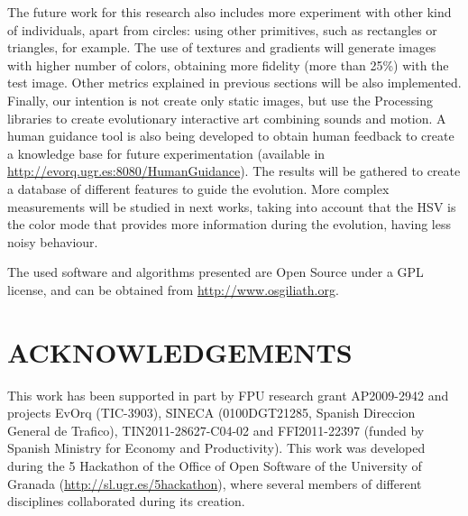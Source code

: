 \documentclass[a4paper,twoside]{article}
\begin{document}
The future work for this research also includes more experiment with other kind of individuals, apart from circles: using other primitives, such as rectangles or triangles, for example. The use of textures and gradients will generate images with higher number of colors, obtaining more fidelity (more than 25\%) with the test image. Other metrics explained in previous sections will be also implemented. Finally, our intention is not create only static images, but use the Processing libraries to create evolutionary interactive art combining sounds and motion. A human guidance tool is also being developed to obtain human feedback to create a knowledge base for future experimentation (available in \url{http://evorq.ugr.es:8080/HumanGuidance}). The results will be gathered to create a database of different features to guide the evolution. More complex measurements will be studied in next works, taking into account that the HSV is the color mode that provides more information during the evolution, having less noisy behaviour.

The used software and algorithms presented are Open Source under a GPL license, and can be obtained from \url{http://www.osgiliath.org}.

\section*{\uppercase{acknowledgements}}
\noindent This work has been supported in part by FPU research grant AP2009-2942
and projects EvOrq (TIC-3903), SINECA (0100DGT21285, Spanish Direccion
General de Trafico), TIN2011-28627-C04-02 and FFI2011-22397 (funded by
Spanish Ministry for Economy and Productivity). This work was
developed during the 5 Hackathon of the Office of Open Software of the
University of Granada (\url{http://sl.ugr.es/5hackathon}), where
several members of different disciplines collaborated during its
creation. 

\vfill


\end{document}
